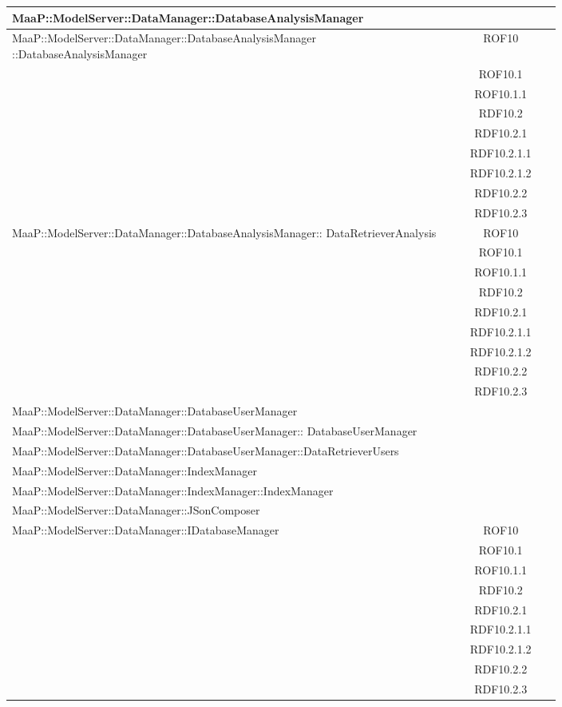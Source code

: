 \begin{center}
\begin{longtable}{|p{0.8\linewidth}|c|}
\midrule
MaaP::ModelServer::DataManager::DatabaseAnalysisManager 
& \\

\midrule 
MaaP::ModelServer::DataManager::DatabaseAnalysisManager ::DatabaseAnalysisManager
& ROF10\\
& ROF10.1\\
& ROF10.1.1\\ 
& RDF10.2\\
& RDF10.2.1\\
& RDF10.2.1.1\\
& RDF10.2.1.2\\
& RDF10.2.2\\
& RDF10.2.3\\

\midrule
MaaP::ModelServer::DataManager::DatabaseAnalysisManager:: DataRetrieverAnalysis 
& ROF10\\
& ROF10.1\\
& ROF10.1.1\\
& RDF10.2\\
& RDF10.2.1\\
& RDF10.2.1.1\\
& RDF10.2.1.2\\
& RDF10.2.2\\
& RDF10.2.3\\

\midrule 
MaaP::ModelServer::DataManager::DatabaseUserManager 
& \\

\midrule 
MaaP::ModelServer::DataManager::DatabaseUserManager:: DatabaseUserManager
& \\

\midrule 
MaaP::ModelServer::DataManager::DatabaseUserManager::DataRetrieverUsers
& \\

\midrule 
MaaP::ModelServer::DataManager::IndexManager
& \\

\midrule 
MaaP::ModelServer::DataManager::IndexManager::IndexManager
& \\

\midrule 
MaaP::ModelServer::DataManager::JSonComposer
& \\

\midrule 
MaaP::ModelServer::DataManager::IDatabaseManager
& ROF10\\
& ROF10.1\\
& ROF10.1.1\\
& RDF10.2\\
& RDF10.2.1\\
& RDF10.2.1.1\\
& RDF10.2.1.2\\
& RDF10.2.2\\
& RDF10.2.3\\


\end{longtable}
\end{center}
